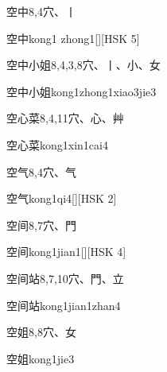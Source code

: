 \begin{entry}{空中}{8,4}{⽳、⼁}
  \begin{phonetics}{空中}{kong1 zhong1}[][HSK 5]
  \end{phonetics}
\end{entry}

\begin{entry}{空中小姐}{8,4,3,8}{⽳、⼁、⼩、⼥}
  \begin{phonetics}{空中小姐}{kong1zhong1xiao3jie3}
  \end{phonetics}
\end{entry}

\begin{entry}{空心菜}{8,4,11}{⽳、⼼、⾋}
  \begin{phonetics}{空心菜}{kong1xin1cai4}
  \end{phonetics}
\end{entry}

\begin{entry}{空气}{8,4}{⽳、⽓}
  \begin{phonetics}{空气}{kong1qi4}[][HSK 2]
  \end{phonetics}
\end{entry}

\begin{entry}{空间}{8,7}{⽳、⾨}
  \begin{phonetics}{空间}{kong1jian1}[][HSK 4]
  \end{phonetics}
\end{entry}

\begin{entry}{空间站}{8,7,10}{⽳、⾨、⽴}
  \begin{phonetics}{空间站}{kong1jian1zhan4}
  \end{phonetics}
\end{entry}

\begin{entry}{空姐}{8,8}{⽳、⼥}
  \begin{phonetics}{空姐}{kong1jie3}
  \end{phonetics}
\end{entry}

